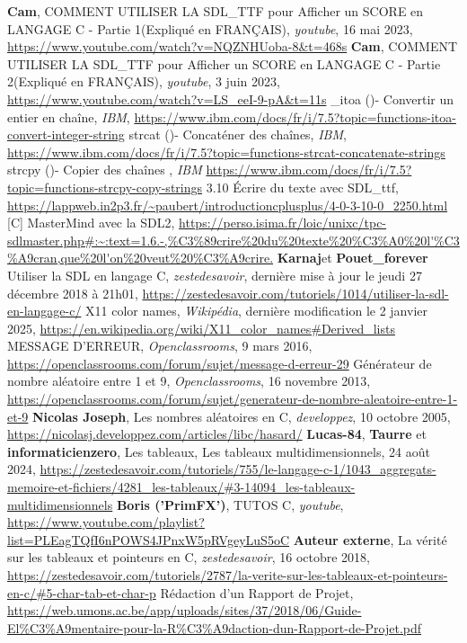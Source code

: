 \documentclass[a4paper,10p]{report}
\begin{document}
\begin{thebibliography}{99}
 \textbf{Cam}, COMMENT UTILISER LA SDL\_TTF pour Afficher un SCORE en LANGAGE C - Partie 1(Expliqué en FRANÇAIS), \textit{youtube}, 16 mai 2023, \url{https://www.youtube.com/watch?v=NQZNHUoba-8&t=468s} 
 \textbf{Cam}, COMMENT UTILISER LA SDL\_TTF pour Afficher un SCORE en LANGAGE C - Partie 2(Expliqué en FRANÇAIS), \textit{youtube}, 3 juin 2023, \url{https://www.youtube.com/watch?v=LS_eeI-9-pA&t=11s}
 \_itoa ()- Convertir un entier en chaîne, \textit{IBM}, \url{https://www.ibm.com/docs/fr/i/7.5?topic=functions-itoa-convert-integer-string}
 strcat ()- Concaténer des chaînes, \textit{IBM}, \url{https://www.ibm.com/docs/fr/i/7.5?topic=functions-strcat-concatenate-strings}
 strcpy ()- Copier des chaînes , \textit{IBM} \url{https://www.ibm.com/docs/fr/i/7.5?topic=functions-strcpy-copy-strings}
 3.10 Écrire du texte avec SDL\_ttf, \url{https://lappweb.in2p3.fr/~paubert/introductioncplusplus/4-0-3-10-0_2250.html}
 [C] MasterMind avec la SDL2, \url{https://perso.isima.fr/loic/unixc/tpc-sdlmaster.php#:~:text=1.6.-,%C3%89crire%20du%20texte%20%C3%A0%20l'%C3%A9cran,que%20l'on%20veut%20%C3%A9crire.}
 \textbf{Karnaj}et \textbf{Pouet\_forever} Utiliser la SDL en langage C, \textit{zestedesavoir}, dernière mise à jour le jeudi 27 décembre 2018 à 21h01, \url{https://zestedesavoir.com/tutoriels/1014/utiliser-la-sdl-en-langage-c/}
 X11 color names, \textit{Wikipédia}, dernière modification le 2 janvier 2025, \url{https://en.wikipedia.org/wiki/X11_color_names#Derived_lists}
MESSAGE D'ERREUR, \textit{Openclassrooms}, 9 mars 2016, \url{https://openclassrooms.com/forum/sujet/message-d-erreur-29}
Générateur de nombre aléatoire entre 1 et 9,  \textit{Openclassrooms}, 16 novembre 2013, \url{https://openclassrooms.com/forum/sujet/generateur-de-nombre-aleatoire-entre-1-et-9}
 \textbf{Nicolas Joseph}, Les nombres aléatoires en C, \textit{developpez}, 10 octobre 2005, \url{https://nicolasj.developpez.com/articles/libc/hasard/}
 \textbf{Lucas-84}, \textbf{Taurre} et \textbf{informaticienzero}, Les tableaux, Les tableaux multidimensionnels, 24 août 2024, \url{https://zestedesavoir.com/tutoriels/755/le-langage-c-1/1043_aggregats-memoire-et-fichiers/4281_les-tableaux/#3-14094_les-tableaux-multidimensionnels}
 \textbf{Boris ('PrimFX')}, TUTOS C, \textit{youtube}, \url{https://www.youtube.com/playlist?list=PLEagTQfI6nPOWS4JPnxW5pRVgeyLuS5oC}
 \textbf{Auteur externe}, La vérité sur les tableaux et pointeurs en C, \textit{zestedesavoir}, 16 octobre 2018, \url{https://zestedesavoir.com/tutoriels/2787/la-verite-sur-les-tableaux-et-pointeurs-en-c/#5-char-tab-et-char-p}
 Rédaction d’un Rapport de Projet, \url{https://web.umons.ac.be/app/uploads/sites/37/2018/06/Guide-El%C3%A9mentaire-pour-la-R%C3%A9daction-dun-Rapport-de-Projet.pdf}
\end{thebibliography}
\end{document}

